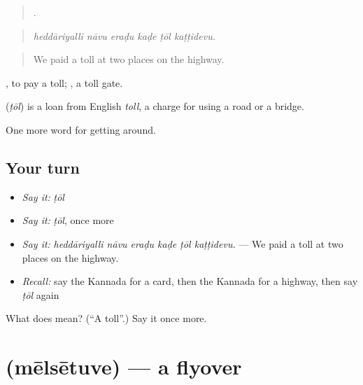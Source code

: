 \begin{quote}
     .
\end{quote}

\begin{quote}
\emph{heddāriyalli nāvu eraḍu kaḍe ṭōl kaṭṭidevu.}
\end{quote}

\begin{quote}
We paid a toll at two places on the highway.
\end{quote}

 , to pay a toll;  , a toll gate.

\begin{cousinweb}
\textbf{} (\emph{ṭōl}) is a loan from English \emph{toll}, a charge for using a road or a bridge.
\end{cousinweb}

\begin{grammarlens}[title={What you've built}]
One more word for getting around.
\end{grammarlens}

\subsection*{Your turn}
\begin{itemize}
\raggedright
  \item \emph{Say it:} \emph{ṭōl}
  \item \emph{Say it:} \emph{ṭōl}, once more
  \item \emph{Say it:} \emph{heddāriyalli nāvu eraḍu kaḍe ṭōl kaṭṭidevu.} — We paid a toll at two places on the highway.
  \item \emph{Recall:} say the Kannada for a card, then the Kannada for a highway, then say \emph{ṭōl} again
\end{itemize}

\begin{tcolorbox}[breakable,colback=teal!4,colframe=teal!35!black,title={Before you move on}]
What does  mean? (\textquotedblleft{}A toll\textquotedblright{}.) Say it once more.
\end{tcolorbox}
\section[\texorpdfstring{\kn{ಮೇಲ್ಸೇತುವೆ} (mēlsētuve)}{ಮೇಲ್ಸೇತುವೆ (mēlsētuve)}]{ (mēlsētuve) — a flyover}


